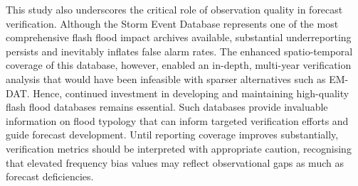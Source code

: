 This  study also underscores the critical role of observation quality in forecast verification. Although the Storm Event Database represents one of the most comprehensive flash flood impact archives available, substantial underreporting persists and inevitably inflates false alarm rates. The enhanced spatio-temporal coverage of this database, however, enabled an in-depth, multi-year verification analysis that would have been infeasible with sparser alternatives such as EM-DAT. Hence, continued investment in developing and maintaining high-quality flash flood databases remains essential. Such databases provide invaluable information on flood typology that can inform targeted verification efforts and guide forecast development. Until reporting coverage improves substantially, verification metrics should be interpreted with appropriate caution, recognising that elevated frequency bias values may reflect observational gaps as much as forecast deficiencies.
